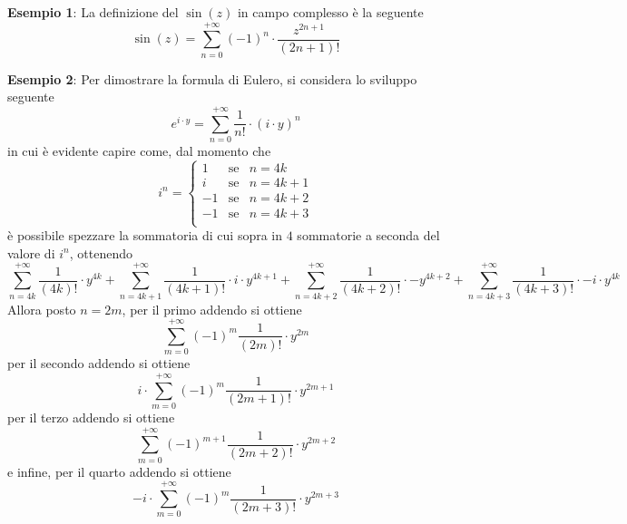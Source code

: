 \documentclass[a4paper]{extarticle}
\begin{document}
\vspace{1em}
\noindent
\textbf{Esempio 1}: La definizione del $\sin(z)$ in campo complesso è la seguente
\[\sin(z) = \sum_{n=0}^{+\infty} (-1)^n \cdot \frac{z^{2n+1}}{(2n+1)!}\]

\vspace{1em}
\noindent
\textbf{Esempio 2}: Per dimostrare la formula di Eulero, si considera lo sviluppo seguente
\[e^{i \cdot y} = \sum_{n=0}^{+\infty} \frac{1}{n!} \cdot (i \cdot y)^n\]
in cui è evidente capire come, dal momento che
\[i^n = \left\{
    \begin{array}{lll}
        1 & \text{se} & n=4k\\
        i & \text{se} & n=4k+1\\
        -1 & \text{se} & n=4k+2\\
        -1 & \text{se} & n=4k+3\\
    \end{array}
\right.\]
è possibile spezzare la sommatoria di cui sopra in $4$ sommatorie a seconda del valore di $i^n$, ottenendo
\[\sum_{n=4k}^{+\infty} \frac{1}{(4k)!} \cdot y^{4k} + \sum_{n=4k+1}^{+\infty} \frac{1}{(4k+1)!} \cdot i \cdot y^{4k+1} + \sum_{n=4k+2}^{+\infty} \frac{1}{(4k+2)!} \cdot -y^{4k+2} + \sum_{n=4k+3}^{+\infty} \frac{1}{(4k+3)!} \cdot -i \cdot y^{4k}\]
Allora posto $n=2m$, per il primo addendo si ottiene
\[\sum_{m=0}^{+\infty} (-1)^m \frac{1}{(2m)!} \cdot y^{2m}\]
per il secondo addendo si ottiene
\[i \cdot \sum_{m=0}^{+\infty} (-1)^m \frac{1}{(2m+1)!} \cdot y^{2m+1}\]
per il terzo addendo si ottiene
\[\sum_{m=0}^{+\infty} (-1)^{m+1} \frac{1}{(2m+2)!} \cdot y^{2m+2}\]
e infine, per il quarto addendo si ottiene
\[-i \cdot \sum_{m=0}^{+\infty} (-1)^m \frac{1}{(2m+3)!} \cdot y^{2m+3}\]

\newpage
\end{document}
